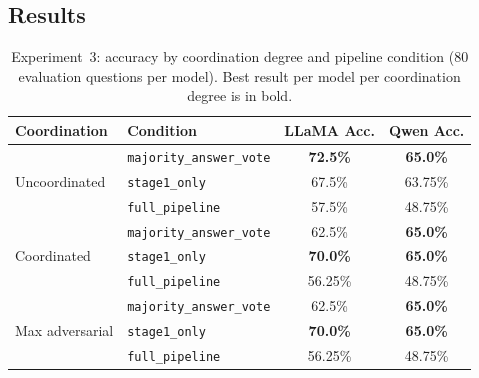 \documentclass[11pt]{article}
\begin{document}
\subsection{Results}
\label{sec:exp3-results}

\begin{table}[h]
\centering
\caption{Experiment~3: accuracy by coordination degree and pipeline condition
  (80 evaluation questions per model). Best result per model per coordination
  degree is in bold.}
\label{tab:exp3-accuracy}
\small
\begin{tabular}{llcc}
\toprule
\textbf{Coordination} & \textbf{Condition}
  & \textbf{LLaMA Acc.} & \textbf{Qwen Acc.} \\
\midrule
\multirow{3}{*}{Uncoordinated}
  & \texttt{majority\_answer\_vote} & \textbf{72.5\%} & \textbf{65.0\%} \\
  & \texttt{stage1\_only}           & 67.5\%          & 63.75\%         \\
  & \texttt{full\_pipeline}         & 57.5\%          & 48.75\%         \\
\midrule
\multirow{3}{*}{Coordinated}
  & \texttt{majority\_answer\_vote} & 62.5\%          & \textbf{65.0\%} \\
  & \texttt{stage1\_only}           & \textbf{70.0\%} & \textbf{65.0\%} \\
  & \texttt{full\_pipeline}         & 56.25\%         & 48.75\%         \\
\midrule
\multirow{3}{*}{Max adversarial}
  & \texttt{majority\_answer\_vote} & 62.5\%          & \textbf{65.0\%} \\
  & \texttt{stage1\_only}           & \textbf{70.0\%} & \textbf{65.0\%} \\
  & \texttt{full\_pipeline}         & 56.25\%         & 48.75\%         \\
\bottomrule
\end{tabular}
\end{table}
\end{document}
